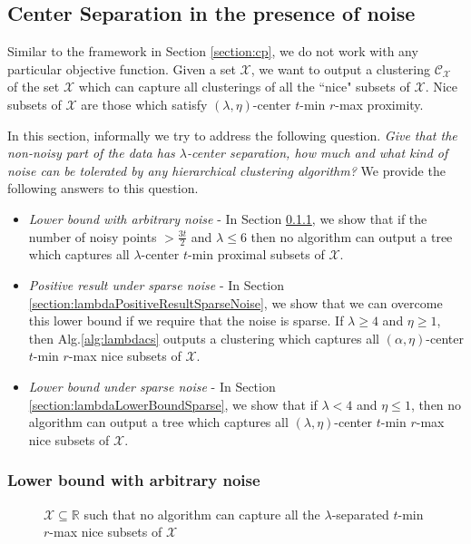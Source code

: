 \documentclass[anon,12pt]{colt2016} %
\newcommand{\mc}{\mathcal}
\begin{document}
\subsection{Center Separation in the presence of noise}

Similar to the framework in Section \ref{section:cp}, we do not work with any particular objective function. Given a set $\mc X$, we want to output a clustering $\mc C_{\mc X}$ of the set $\mc X$ which can capture  all clusterings of all the ``nice" subsets of $\mc X$. Nice subsets of $\mc X$ are those which satisfy $(\lambda, \eta)$-center $t$-min $r$-max proximity.


In this section, informally we try to address the following question. {\it Give that the non-noisy part of the data has $\lambda$-center separation, how much and what kind of noise can be tolerated by any hierarchical clustering algorithm?} We provide the following answers to this question.

\begin{itemize}
\item {\it Lower bound with arbitrary noise} - In Section \ref{section:lambdaLowerBoundArbitrary}, we show that if the number of noisy points $> \frac{3t}{2}$ and $\lambda \le 6$ then no algorithm can output a tree which captures all $\lambda$-center $t$-min proximal subsets of $\mc X$.
\item  {\it Positive result under sparse noise} - In Section \ref{section:lambdaPositiveResultSparseNoise}, we show that we can overcome this lower bound if we require that the noise is sparse. If $\lambda \ge 4$ and $\eta \ge 1$, then Alg.\ref{alg:lambdacs} outputs a clustering which captures all $(\alpha, \eta)$-center $t$-min $r$-max nice subsets of $\mc X$.
\item  {\it Lower bound under sparse noise} - In Section \ref{section:lambdaLowerBoundSparse}, we show that if $\lambda < 4$ and $\eta \le 1$, then no algorithm can output a tree which captures all $(\lambda, \eta)$-center $t$-min $r$-max nice subsets of $\mc X$.
\end{itemize} 


\subsubsection{Lower bound with arbitrary noise}
\label{section:lambdaLowerBoundArbitrary}
\begin{figure}

\caption{$\mc X \subseteq \mathbb{R}$ such that no algorithm can capture all the $\lambda$-separated $t$-min $r$-max nice subsets of $\mc X$}
\label{fig:nosparsealglambdacs}
\end{figure}
\end{document}
